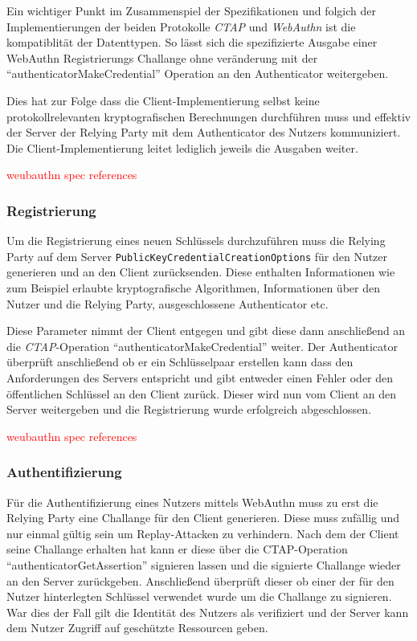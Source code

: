 \documentclass[journal]{IEEEtran}
\begin{document}
Ein wichtiger Punkt im Zusammenspiel der Spezifikationen und folgich der
Implementierungen der beiden Protokolle \textit{CTAP} und \textit{WebAuthn} ist
die kompatiblität der Datenttypen. So lässt sich die spezifizierte Ausgabe
einer WebAuthn Registrierungs Challange ohne veränderung mit der
``authenticatorMakeCredential'' Operation an den Authenticator weitergeben.

Dies hat zur Folge dass die Client-Implementierung selbst keine
protokollrelevanten kryptografischen Berechnungen durchführen muss und effektiv
der Server der Relying Party mit dem Authenticator des Nutzers kommuniziert.
Die Client-Implementierung leitet lediglich jeweils die Ausgaben weiter.

\textcolor{red}{weubauthn spec references}

\subsubsection{Registrierung}

Um die Registrierung eines neuen Schlüssels durchzuführen muss die Relying
Party auf dem Server \texttt{PublicKeyCredentialCreationOptions} für den Nutzer
generieren und an den Client zurücksenden. Diese enthalten Informationen wie
zum Beispiel erlaubte kryptografische Algorithmen, Informationen über den
Nutzer und die Relying Party, ausgeschlossene Authenticator etc.

Diese Parameter nimmt der Client entgegen und gibt diese dann anschließend an
die \textit{CTAP}-Operation ``authenticatorMakeCredential'' weiter. Der
Authenticator überprüft anschließend ob er ein Schlüsselpaar erstellen kann
dass den Anforderungen des Servers entspricht und gibt entweder einen Fehler
oder den öffentlichen Schlüssel an den Client zurück. Dieser wird nun vom
Client an den Server weitergeben und die Registrierung wurde erfolgreich
abgeschlossen.

\textcolor{red}{weubauthn spec references}

\subsubsection{Authentifizierung}

Für die Authentifizierung eines Nutzers mittels WebAuthn muss zu erst die
Relying Party eine Challange für den Client generieren. Diese muss zufällig und
nur einmal gültig sein um Replay-Attacken zu verhindern. Nach dem der Client
seine Challange erhalten hat kann er diese über die CTAP-Operation
``authenticatorGetAssertion'' signieren lassen und die signierte Challange
wieder an den Server zurückgeben. Anschließend überprüft dieser ob einer der
für den Nutzer hinterlegten Schlüssel verwendet wurde um die Challange zu
signieren. War dies der Fall gilt die Identität des Nutzers als verifiziert und
der Server kann dem Nutzer Zugriff auf geschützte Ressourcen geben.
\end{document}
